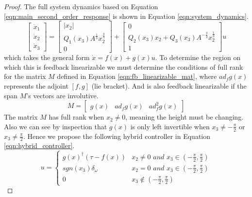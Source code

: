 \begin{proof}
The full system dynamics based on Equation \eqref{eqn:main_second_order_response} is 
shown in Equation \eqref{eqn:system_dynamics}.
\begin{equation}
\begin{bmatrix}
\dot{x}_1 \\ \dot{x}_2 \\ \dot{x}_3 
\end{bmatrix} = \begin{bmatrix}
|x_2| \\ Q_1(x_3)A^{\frac{1}{3}} x_2^{\frac{4}{3}} \\ 0
\end{bmatrix} + \begin{bmatrix}
0 \\ Q_2(x_3) x_2 + Q_3(x_3) A^{-\frac{2}{3}} x_2^{\frac{1}{3}} \\ 1
\end{bmatrix} u
\label{eqn:system_dynamics}
\end{equation}
which takes the general form $\dot{x} = f(x) + g(x)u$. To determine the region on which this is feedback linearizable we must determine the conditions of full rank for the matrix $M$ defined in Equation \eqref{eqn:fb_linearizable_mat}, where $ad_f g(x)$ represents the adjoint $[f,g]$ (lie bracket). And is also feedback linearizable if the span $M$'s vectors are involutive. 
\begin{equation}
M = \begin{bmatrix}
g(x) & ad_f g(x) & ad_f^2 g(x)
\end{bmatrix} \label{eqn:fb_linearizable_mat}
\end{equation}
The matrix $M$ has full rank when $x_2 \neq 0$, meaning the height must be changing. Also we can see by inspection that $g(x)$ is only left invertible when $x_3 \neq -\frac{\pi}{2}$ or $x_3 \neq \frac{\pi}{2}$. Hence we propose the following hybrid controller in Equation \eqref{eqn:hybrid_controller}.
\begin{equation}
u = 
\begin{cases} 
g(x)^{\dagger}( \tau - f(x)) & x_2 \neq 0 \textit{ and } x_3 \in (-\frac{\pi}{2}, \frac{\pi}{2}) \\
sgn (x_3)\delta_{\omega} & x_2 = 0 \textit{ and } x_3 \in (-\frac{\pi}{2}, \frac{\pi}{2}) \\
0 & x_3 \not\in (-\frac{\pi}{2}, \frac{\pi}{2})
\end{cases}
\label{eqn:hybrid_controller}
\end{equation}

\end{proof}
